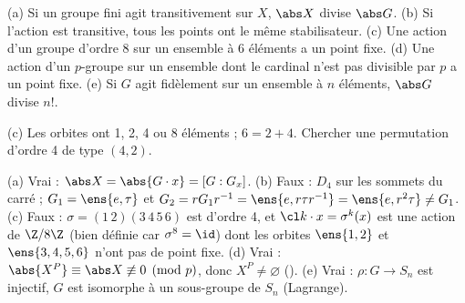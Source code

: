 \begin{exo}
(a) Si un groupe fini agit transitivement sur $X$, $\abs X$ divise $\abs G$. (b) Si l'action est transitive, tous les points ont le même stabilisateur. (c) Une action d'un groupe d'ordre 8 sur un ensemble à 6 éléments a un point fixe. (d) Une action d'un $p$-groupe sur un ensemble dont le cardinal n'est pas divisible par $p$ a un point fixe. (e) Si $G$ agit fidèlement sur un ensemble à $n$ éléments, $\abs G$ divise $n!$.
\begin{indication}
(c) Les orbites ont 1, 2, 4 ou 8 éléments ; $6=2+4$. Chercher une permutation d'ordre 4 de type $(4,2)$.
\end{indication}
\begin{corrige}
(a) Vrai : $\abs X=\abs{G\cdot x}=[G:G_x]$.
(b) Faux : $D_4$ sur les sommets du carré ; $G_1=\ens{e,\tau}$ et $G_2=rG_1r^{-1}=\ens{e,r\tau r^{-1}}=\ens{e,r^2\tau}\neq G_1$.
(c) Faux : $\sigma=(1\,2)(3\,4\,5\,6)$ est d'ordre 4, et $\cl k\cdot x=\sigma^k(x)$ est une action de $\Z/8\Z$ (bien définie car $\sigma^8=\id$) dont les orbites $\ens{1,2}$ et $\ens{3,4,5,6}$ n'ont pas de point fixe.
(d) Vrai : $\abs{X^P}\equiv\abs X\not\equiv0\pmod p$, donc $X^P\neq\varnothing$ ().
(e) Vrai : $\rho:G\to S_n$ est injectif, $G$ est isomorphe à un sous-groupe de $S_n$ (Lagrange).
\end{corrige}
\end{exo}

